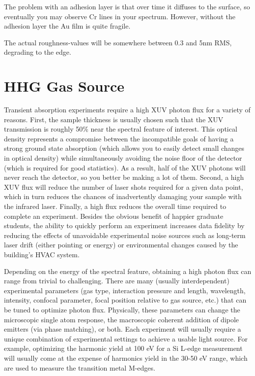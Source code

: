 The problem with an adhesion layer is that over time it diffuses to the surface, so eventually you may observe Cr lines in your spectrum.  However, without the adhesion layer the Au film is quite fragile.  


The actual roughness-values will be somewhere between 0.3 and 5nm RMS, degrading to the edge.



\section{HHG Gas Source}

Transient absorption experiments require a high XUV photon flux for a variety of reasons. First, the sample thickness is usually chosen such that the XUV transmission is roughly 50\% near the spectral feature of interest. This optical density represents a compromise between the incompatible goals of having a strong ground state absorption (which allows you to easily detect small changes in optical density) while simultaneously avoiding the noise floor of the detector (which is required for good statistics). As a result, half of the XUV photons will never reach the detector, so you better be making a lot of them. Second, a high XUV flux will reduce the number of laser shots required for a given data point, which in turn reduces the chances of inadvertently damaging your sample with the infrared laser. Finally, a high flux reduces the overall time required to complete an experiment. Besides the obvious benefit of happier graduate students, the ability to quickly perform an experiment increases data fidelity by reducing the effects of unavoidable experimental noise sources such as long-term laser drift (either pointing or energy) or environmental changes caused by the building's HVAC system.

Depending on the energy of the spectral feature, obtaining a high photon flux can range from trivial to challenging. There are many (usually interdependent) experimental parameters (gas type, interaction pressure and length, wavelength, intensity, confocal parameter, focal position relative to gas source, etc.) that can be tuned to optimize photon flux. Physically, these parameters can change the microscopic single atom response, the macroscopic coherent addition of dipole emitters (via phase matching), or both. Each experiment will usually require a unique combination of experimental settings to achieve a usable light source. For example, optimizing the harmonic yield at 100 eV for a Si L-edge measurement will usually come at the expense of harmonics yield in the 30-50 eV range, which are used to measure the transition metal M-edges.

